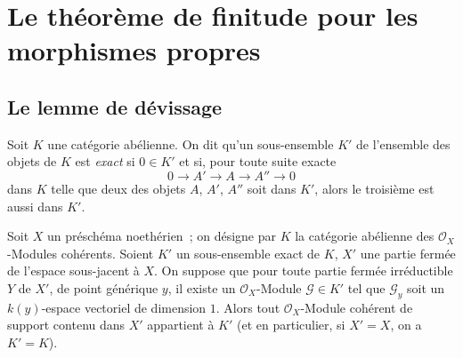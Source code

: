 \section{Le théorème de finitude pour les morphismes propres}
\label{section:III.3-fr}

\subsection{Le lemme de dévissage}
\label{subsection:III.3.1-fr}

\begin{definition}[3.1.1]
\label{III.3.1.1-fr}
Soit $K$ une catégorie abélienne. On dit qu'un sous-ensemble $K'$ de
l'ensemble des objets de $K$ est \emph{exact} si $0\in K'$ et si, pour toute
suite exacte
\[
0\longrightarrow A'\longrightarrow A\longrightarrow A''\longrightarrow0
\]
dans $K$ telle que deux des objets $A$, $A'$, $A''$ soit dans $K'$, alors le
troisième est aussi dans $K'$.
\end{definition}

\begin{theorem}[3.1.2]
\label{III.3.1.2-fr}
Soit $X$ un préschéma noethérien~; on désigne par $K$ la catégorie abélienne
des $\mathcal O_X$-Modules cohérents. Soient $K'$ un sous-ensemble exact de
$K$, $X'$ une partie fermée de l'espace sous-jacent à $X$. On suppose que
pour toute partie fermée irréductible $Y$ de $X'$, de point générique $y$, il
existe un $\mathcal O_X$-Module $\mathcal G\in K'$ tel que $\mathcal G_y$ soit
un $k(y)$-espace vectoriel de dimension $1$. Alors tout $\mathcal O_X$-Module
cohérent de support contenu dans $X'$ appartient à $K'$ (et en particulier,
si $X'=X$, on a $K'=K$).
\end{theorem}

